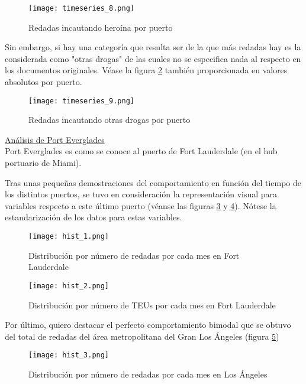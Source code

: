 \documentclass[12pt]{article}
\begin{document}
		\begin{figure}[H]
			\caption{\label{timeseries_8} Redadas incautando heroína por puerto}
			\centering
			\hspace*{1cm}
			\texttt{[image: timeseries\_8.png]}
		\end{figure}
	
		Sin embargo, si hay una categoría que resulta ser de la que más redadas hay es la considerada como "otras drogas" de las cuales no se especifica nada al respecto en los documentos originales. Véase la figura \ref{timeseries_9} también proporcionada en valores absolutos por puerto.
		
		\begin{figure}[H]
			\caption{\label{timeseries_9} Redadas incautando otras drogas por puerto}
			\centering
			\hspace*{1cm}
			\texttt{[image: timeseries\_9.png]}
		\end{figure}
	
		\underline{Análisis de Port Everglades}\\
		Port Everglades es como se conoce al puerto de Fort Lauderdale (en el hub portuario de Miami).
		
		Tras unas pequeñas demostraciones del comportamiento en función del tiempo de los distintos puertos, se tuvo en consideración la representación visual para variables respecto a este último puerto (véanse las figuras \ref{hist_1} y \ref{hist_2}). Nótese la estandarización de los datos para estas variables.
		
		\begin{figure}[H]
			\caption{\label{hist_1} Distribución por número de redadas por cada mes en Fort Lauderdale}
			\centering
			\hspace*{1cm}
			\texttt{[image: hist\_1.png]}
		\end{figure}
	
		\begin{figure}[H]
			\caption{\label{hist_2} Distribución por número de TEUs por cada mes en Fort Lauderdale}
			\centering
			\hspace*{1cm}
			\texttt{[image: hist\_2.png]}
		\end{figure}
	
		Por último, quiero destacar el perfecto comportamiento bimodal que se obtuvo del total de redadas del área metropolitana del Gran Los Ángeles (figura  \ref{hist_3})
		
		\begin{figure}[H]
			\caption{\label{hist_3} Distribución por número de redadas por cada mes en Los Ángeles}
			\centering
			\hspace*{1cm}
			\texttt{[image: hist\_3.png]}
		\end{figure}
	
\end{document}
